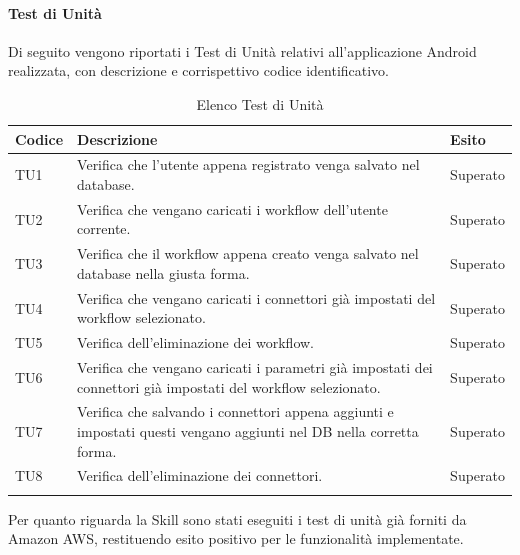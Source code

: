 \paragraph{Test di Unità}
\label{sec:tuRA}
Di seguito vengono riportati i Test di Unità relativi all'applicazione Android realizzata, con descrizione e corrispettivo codice identificativo.
\begin{center}
	\centering
	\renewcommand{\arraystretch}{1.5}
	\begin{longtable}{  p{1.5cm}  p{10.5cm} p{2cm}  }
		\rowcolor{tableHeadYellow}
		\textbf{Codice}   & \textbf{Descrizione} & \textbf{Esito} \\ 
		\endhead
		TU1 & Verifica che l’utente appena registrato venga salvato nel database.  & Superato \\
		TU2 & Verifica che vengano caricati i workflow dell’utente corrente. & Superato \\
		TU3 & Verifica che il workflow appena creato venga salvato nel database nella giusta forma. & Superato \\
		TU4 & Verifica che vengano caricati i connettori già impostati del workflow selezionato. & Superato \\
		TU5 & Verifica dell’eliminazione dei workflow. & Superato \\
		TU6 & Verifica che vengano caricati i parametri già impostati dei connettori già impostati del workflow selezionato. & Superato \\
		TU7 & Verifica che salvando i connettori appena aggiunti e impostati questi vengano aggiunti nel DB nella corretta forma. & Superato \\
		TU8 & Verifica dell’eliminazione dei connettori. & Superato \\
		\rowcolor{white}
		\caption{Elenco Test di Unità}
	\end{longtable}
\end{center}
Per quanto riguarda la Skill sono stati eseguiti i test di unità già forniti da Amazon AWS, restituendo esito positivo per le funzionalità implementate.
